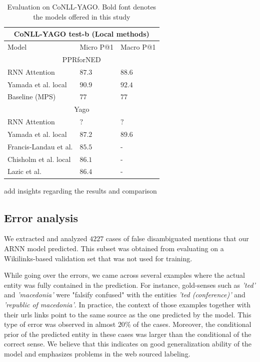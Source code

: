 \documentclass[11pt]{article}
\begin{document}
\begin{table}[h]
	\begin{center}
		\begin{tabular}{|p{3.5cm}| p{1.5cm} p{1.5cm}|}
			\hline \multicolumn{3}{|c|}{CoNLL-YAGO test-b (Local methods)} \\
			\hline Model & Micro P@1 & Macro P@1 \\ 
			\hline \multicolumn{3}{|c|}{PPRforNED} \\
			\hline RNN Attention    & $87.3$  & $88.6$ \\
			Yamada et al. local     & $90.9$  & $92.4$ \\
			Baseline (MPS)          & $77$    & $77$ \\
			\hline \multicolumn{3}{|c|}{Yago} \\
			\hline RNN Attention    & $?$  & $?$ \\
			Yamada et al. local     & $87.2$  & $89.6$ \\
			Francis-Landau et al.   & $85.5$  & - \\
			Chisholm et al. local   & $86.1$  & - \\
			\hline Lazic et al.     & $86.4$  & - \\
			\hline
		\end{tabular}
	\end{center}
	\caption{\label{tab:conll} Evaluation on CoNLL-YAGO. Bold font denotes the models offered in this study}
\end{table}


add insights regarding the results and comparison 

\subsection{Error analysis}

We extracted and analyzed $4227$ cases of false disambiguated mentions that our ARNN model predicted. This subset was obtained from evaluating on a Wikilinks-based validation set that was not used for training. 

While going over the errors, we came across several examples where the actual entity was fully contained in the prediction. For instance, gold-senses such as \textit{'ted'} and \textit{'macedonia'} were "falsify confused" with the entities \textit{'ted (conference)'} and \textit{'republic of macedonia'}. In practice, the context of those examples together with their urls links point to the same source as the one predicted by the model. This type of error was observed in almost $20$\% of the cases. Moreover, the conditional prior of the predicted entity in these cases was larger than the conditional of the correct sense. We believe that this indicates on good generalization ability of the model and emphasizes problems in the web sourced labeling.
\end{document}
